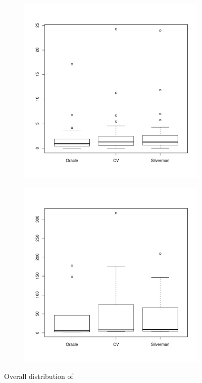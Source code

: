\begin{figure}[htbp]
    \centering
    \begin{subfigure}[t]{0.45\textwidth}
        \includegraphics[width=\textwidth]{results/by_overall/normalized-mise-boxplot}
        \label{fig:discussion:overall_nmise_boxplot:unif}
    \end{subfigure}
    \begin{subfigure}[t]{0.45\textwidth}
        \includegraphics[width=\textwidth]{results/by_overall/normalized-mise-peakpop-boxplot}
        \label{fig:discussion:overall_nmise_boxplot:peak}
    \end{subfigure}
    \caption{Overall distribution of }
    \label{fig:discussion:overall_nmise_boxplot}
\end{figure}

